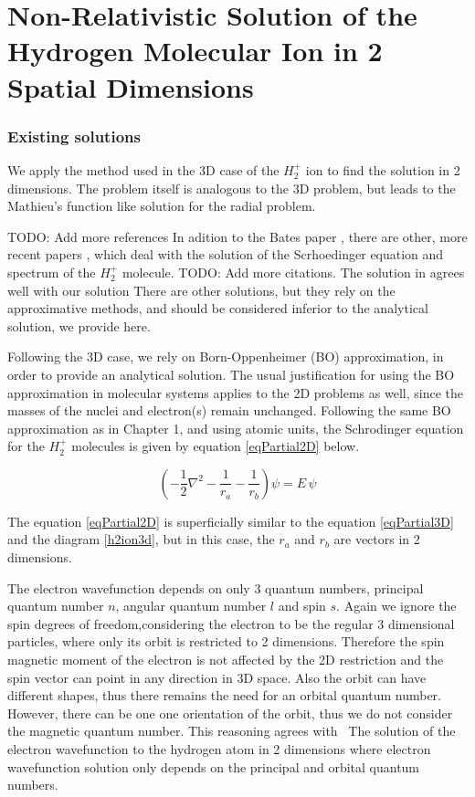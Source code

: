 \chapter{Non-Relativistic Solution of the Hydrogen Molecular Ion in 2 Spatial Dimensions}

\subsection{Existing solutions}

We apply the method used in the 3D case of the $ H_2^{+} $ ion to find the solution in 2 dimensions. The problem itself is analogous to the 3D problem, but leads to the Mathieu's function like solution for the radial problem.

TODO: Add more references
In adition to the Bates paper \cite{Bates1}, there are other, more recent papers \cite{H2Plus2d1} \cite{TwoCentersParticle}, \cite{Kolos} which deal with the solution of the Scrhoedinger equation and spectrum of the $ H_2^{+} $ molecule. TODO: Add more citations.  The solution in \cite{H2Plus2d1} agrees well with our solution There are other solutions, but they rely on the approximative methods, and should be considered inferior to the analytical solution, we provide here. 

Following the 3D case, we rely on Born-Oppenheimer (BO) approximation, in order to provide an analytical solution. The usual justification for using the BO approximation in molecular systems applies to the 2D problems as well, since the masses of the nuclei and electron(s) remain unchanged.  Following the same BO approximation as in Chapter 1, and using atomic units, the Schrodinger equation for the $ H_2^{+} $ molecules is given by equation \eqref{eqPartial2D} below. 

\begin{equation}\label{eqPartial2D}
\left(-\frac{1}{2}\nabla^2-\frac{1}{r_a}-\frac{1}{r_b}\right)\psi = E\,\psi
\end{equation}

The equation \eqref{eqPartial2D} is superficially similar to the equation \eqref{eqPartial3D} and the diagram \ref{h2ion3d}, but in this case, the $ r_a $ and $ r_b $ are vectors in 2 dimensions.

The electron wavefunction depends on only 3 quantum numbers, principal quantum number $ n $, angular quantum number $ l $ and spin $ s $. Again we ignore the spin degrees of freedom,considering the electron to be the regular 3 dimensional particles, where only its orbit is restricted to 2 dimensions.  Therefore the spin magnetic moment of the electron is not affected by the 2D restriction and the spin vector can point in any direction in 3D space. Also the orbit can have different shapes, thus there remains the need for an orbital quantum number. However, there can be one one orientation of the orbit, thus we do not consider the magnetic quantum number. This reasoning agrees with ~The solution of the electron wavefunction to the hydrogen atom in 2 dimensions \cite{H2atom} where electron wavefunction solution only depends on the principal and orbital quantum numbers.

